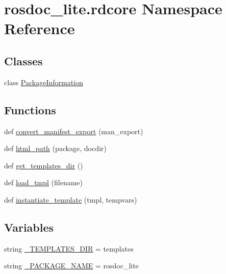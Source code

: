 \hypertarget{namespacerosdoc__lite_1_1rdcore}{}\section{rosdoc\+\_\+lite.\+rdcore Namespace Reference}
\label{namespacerosdoc__lite_1_1rdcore}
\subsection*{Classes}
\begin{DoxyCompactItemize}
\item 
class \hyperlink{classrosdoc__lite_1_1rdcore_1_1PackageInformation}{Package\+Information}
\end{DoxyCompactItemize}
\subsection*{Functions}
\begin{DoxyCompactItemize}
\item 
def \hyperlink{namespacerosdoc__lite_1_1rdcore_a54f36434752521b1acb2eee131f14e14}{convert\+\_\+manifest\+\_\+export} (man\+\_\+export)
\item 
def \hyperlink{namespacerosdoc__lite_1_1rdcore_a0258a0b686b9d2758f11cb67f7d04aab}{html\+\_\+path} (package, docdir)
\item 
def \hyperlink{namespacerosdoc__lite_1_1rdcore_a9746a0c9748cb7d2194cee434de76cc2}{get\+\_\+templates\+\_\+dir} ()
\item 
def \hyperlink{namespacerosdoc__lite_1_1rdcore_a85433f1cabd703f4e329c34162da84d4}{load\+\_\+tmpl} (filename)
\item 
def \hyperlink{namespacerosdoc__lite_1_1rdcore_abc314706b88c2ed5c8f4fc04a6f4d565}{instantiate\+\_\+template} (tmpl, tempvars)
\end{DoxyCompactItemize}
\subsection*{Variables}
\begin{DoxyCompactItemize}
\item 
string \hyperlink{namespacerosdoc__lite_1_1rdcore_afc16859acf352f3906b2af46bb9e1e8c}{\+\_\+\+T\+E\+M\+P\+L\+A\+T\+E\+S\+\_\+\+D\+IR} = \textquotesingle{}templates\textquotesingle{}
\item 
string \hyperlink{namespacerosdoc__lite_1_1rdcore_a10a7465b6eadd19efcdce0a1fd386552}{\+\_\+\+P\+A\+C\+K\+A\+G\+E\+\_\+\+N\+A\+ME} = \textquotesingle{}rosdoc\+\_\+lite\textquotesingle{}
\end{DoxyCompactItemize}



